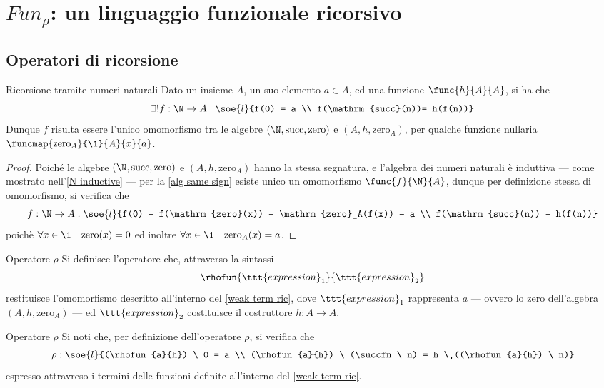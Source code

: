 \documentclass[a4paper, 12pt]{report}
\begin{document}
    \section{$Fun_\rho$: un linguaggio funzionale ricorsivo}

    \subsection{Operatori di ricorsione}

    \begin{framedlem}[label={weak term ric}]{Ricorsione tramite numeri naturali}
        Dato un insieme $A$, un suo elemento $a \in A$, ed una funzione $\func{h}{A}{A}$, si ha che $$\exists ! f: \N \to A \mid \soe{l}{f(0) = a \\ f(\mathrm{succ}(n))= h(f(n))}$$ Dunque $f$ risulta essere l'unico omomorfismo tra le algebre $(\N, \mathrm{succ}, \mathrm{zero})$ e $(A, h, \mathrm{zero}_A)$, per qualche funzione nullaria $\funcmap{\mathrm{zero}_A}{\1}{A}{x}{a}$.
    \end{framedlem}

    \begin{proof}
        Poiché le algebre $(\N, \mathrm{succ}, \mathrm{zero})$ e $(A, h, \mathrm{zero}_A)$ hanno la stessa segnatura, e l'algebra dei numeri naturali è induttiva --- come mostrato nell'\cref{N inductive} --- per la \cref{alg same sign} esiste unico un omomorfismo $\func{f}{\N}{A}$, dunque per definizione stessa di omomorfismo, si verifica che $$f:\N \to A :\soe{l}{f(0) = f(\mathrm{zero}(x)) = \mathrm{zero}_A(f(x)) = a \\ f(\mathrm{succ}(n)) = h(f(n))}$$ poichè $\forall x \in \1 \quad \mathrm{zero}(x) = 0$ ed inoltre $\forall x \in \1 \quad \mathrm{zero}_A(x) = a$.
    \end{proof}

    \begin{frameddefn}{Operatore $\rho$}
        Si definisce  l'operatore che, attraverso la sintassi $$\rhofun{\ttt{expression}_1}{\ttt{expression}_2}$$ restituisce l'omomorfismo descritto all'interno del \cref{weak term ric}, dove $\ttt{expression}_1$ rappresenta $a$ --- ovvero lo zero dell'algebra $(A, h, \mathrm{zero}_A)$ --- ed $\ttt{expression}_2$ costituisce il costruttore $h: A \to A$.
    \end{frameddefn}

    \begin{framedobs}[label={rho obs}]{Operatore $\rho$}
        Si noti che, per definizione dell'operatore $\rho$, si verifica che $$\rho : \soe{l}{(\rhofun{a}{h}) \ 0 = a \\ (\rhofun{a}{h}) \ (\succfn \ n) = h \ ((\rhofun{a}{h}) \ n)}$$ espresso attravreso i termini delle funzioni definite all'interno del \cref{weak term ric}.
    \end{framedobs}
\end{document}
